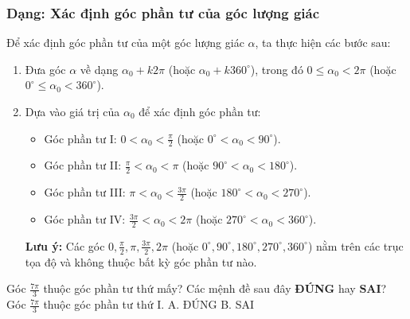 \subsubsection{Dạng: Xác định góc phần tư của góc lượng giác}
\begin{phuongphap}
Để xác định góc phần tư của một góc lượng giác $\alpha$, ta thực hiện các bước sau:
\begin{enumerate}
    \item Đưa góc $\alpha$ về dạng $ \alpha_0 + k2\pi $ (hoặc $ \alpha_0 + k360^\circ $), trong đó $0 \le \alpha_0 < 2\pi$ (hoặc $0^\circ \le \alpha_0 < 360^\circ$).
    \item Dựa vào giá trị của $\alpha_0$ để xác định góc phần tư:
    \begin{itemize}
        \item Góc phần tư I: $0 < \alpha_0 < \frac{\pi}{2}$ (hoặc $0^\circ < \alpha_0 < 90^\circ$).
        \item Góc phần tư II: $\frac{\pi}{2} < \alpha_0 < \pi$ (hoặc $90^\circ < \alpha_0 < 180^\circ$).
        \item Góc phần tư III: $\pi < \alpha_0 < \frac{3\pi}{2}$ (hoặc $180^\circ < \alpha_0 < 270^\circ$).
        \item Góc phần tư IV: $\frac{3\pi}{2} < \alpha_0 < 2\pi$ (hoặc $270^\circ < \alpha_0 < 360^\circ$).
    \end{itemize}
    \textbf{Lưu ý:} Các góc $0, \frac{\pi}{2}, \pi, \frac{3\pi}{2}, 2\pi$ (hoặc $0^\circ, 90^\circ, 180^\circ, 270^\circ, 360^\circ$) nằm trên các trục tọa độ và không thuộc bất kỳ góc phần tư nào.
\end{enumerate}
\end{phuongphap}
\begin{vidumau}
Góc $ \frac{7\pi}{3} $ thuộc góc phần tư thứ mấy? Các mệnh đề sau đây \textbf{ĐÚNG} hay $\textbf{SAI}$?
Góc $ \frac{7\pi}{3} $ thuộc góc phần tư thứ I.
\choice
A. ĐÚNG \True
B. SAI
\end{vidumau}

